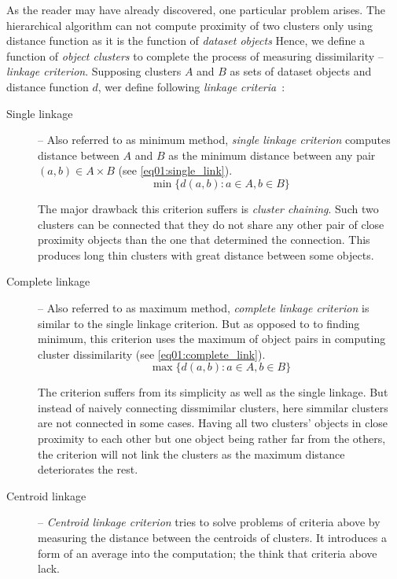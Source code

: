 As the reader may have already discovered, one particular problem arises. The hierarchical algorithm can not compute proximity of two clusters only using distance function as it is the function of \emph{dataset objects} Hence, we define a function of \emph{object clusters} to complete the process of measuring dissimilarity -- \emph{linkage criterion}. Supposing clusters $A$ and $B$ as sets of dataset objects and distance function $d$, wer define following \emph{linkage criteria}~\cite{yim2015hierarchical}:

\begin{description}
	\item[Single linkage] -- Also referred to as minimum method, \emph{single linkage criterion} computes distance between $A$ and $B$ as the minimum distance between any pair $(a,b) \in A\times B$ (see \ref{eq01:single_link}).
	\begin{equation}\label{eq01:single_link}
	\min\{d(a,b) : a \in A, b \in B\}
	\end{equation}
	
	The major drawback this criterion suffers is \emph{cluster chaining}. Such two clusters can be connected that they do not share any other pair of close proximity objects than the one that determined the connection. This produces long thin clusters with great distance between some objects.
	
	\item[Complete linkage] -- Also referred to as maximum method, \emph{complete linkage criterion} is similar to the single linkage criterion. But as opposed to to finding minimum, this criterion uses the maximum of object pairs in computing cluster dissimilarity (see \ref{eq01:complete_link}). 
	\begin{equation}\label{eq01:complete_link}
	\max\{d(a,b) : a \in A, b \in B\}
	\end{equation}
	
	The criterion suffers from its simplicity as well as the single linkage. But instead of naively connecting dissmimilar clusters, here simmilar clusters are not connected in some cases. Having all two clusters' objects in close proximity to each other but one object being rather far from the others, the criterion will not link the clusters as the maximum distance deteriorates the rest.
	
	\item[Centroid linkage] -- \emph{Centroid linkage criterion} tries to solve problems of criteria above by measuring the distance between the centroids of clusters. It introduces a form of an average into the computation; the think that criteria above lack.
\end{description}

